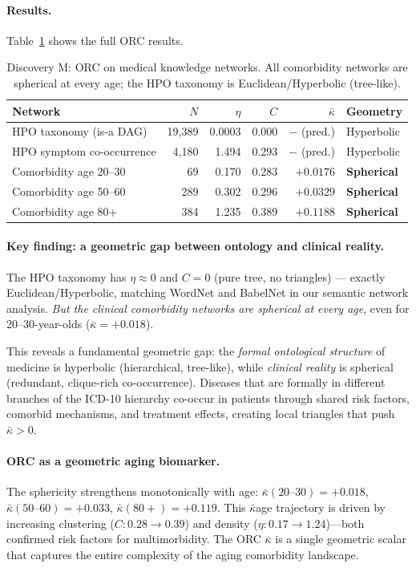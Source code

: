 \documentclass[11pt,a4paper]{article}
\begin{document}
\paragraph{Results.}
Table~\ref{tab:discovery_m} shows the full ORC results.

\begin{table}[h]
\centering
\caption{Discovery M: ORC on medical knowledge networks. All comorbidity networks
are spherical at every age; the HPO taxonomy is Euclidean/Hyperbolic (tree-like).}
\label{tab:discovery_m}
\begin{tabular}{lrrrrl}
\hline
Network & $N$ & $\eta$ & $C$ & $\bar{\kappa}$ & Geometry \\
\hline
HPO taxonomy (is-a DAG)    & 19,389 & 0.0003 & 0.000 & $-$ (pred.) & Hyperbolic \\
HPO symptom co-occurrence  & 4,180  & 1.494  & 0.293 & $-$ (pred.) & Hyperbolic \\
Comorbidity age 20--30     & 69     & 0.170  & 0.283 & $+0.0176$   & \textbf{Spherical} \\
Comorbidity age 50--60     & 289    & 0.302  & 0.296 & $+0.0329$   & \textbf{Spherical} \\
Comorbidity age 80+        & 384    & 1.235  & 0.389 & $+0.1188$   & \textbf{Spherical} \\
\hline
\end{tabular}
\end{table}

\paragraph{Key finding: a geometric gap between ontology and clinical reality.}
The HPO taxonomy has $\eta \approx 0$ and $C=0$ (pure tree, no triangles) --- exactly
Euclidean/Hyperbolic, matching WordNet and BabelNet in our semantic network analysis.
\emph{But the clinical comorbidity networks are spherical at every age}, even for
20--30-year-olds ($\bar{\kappa}=+0.018$).

This reveals a fundamental geometric gap: the \emph{formal ontological structure} of
medicine is hyperbolic (hierarchical, tree-like), while \emph{clinical reality} is
spherical (redundant, clique-rich co-occurrence). Diseases that are formally in
different branches of the ICD-10 hierarchy co-occur in patients through shared risk
factors, comorbid mechanisms, and treatment effects, creating local triangles that
push $\bar{\kappa} > 0$.

\paragraph{ORC as a geometric aging biomarker.}
The sphericity strengthens monotonically with age:
$\bar{\kappa}(20\text{--}30) = +0.018$,
$\bar{\kappa}(50\text{--}60) = +0.033$,
$\bar{\kappa}(80+) = +0.119$.
This $\bar{\kappa}$\textendash{}age trajectory is driven by increasing
clustering ($C: 0.28 \to 0.39$) and density ($\eta: 0.17 \to 1.24$)---both confirmed
risk factors for multimorbidity. The ORC $\bar{\kappa}$ is a single geometric scalar
that captures the entire complexity of the aging comorbidity landscape.
\end{document}

